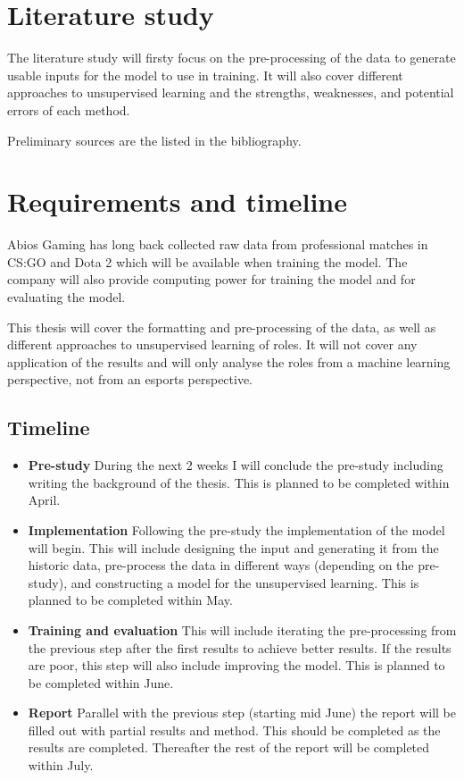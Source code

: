 \documentclass{article}
\begin{document}
\section{Literature study}
The literature study will firsty focus on the pre-processing of the data to generate usable inputs for the model to use in training. It will also cover different approaches to unsupervised learning and the strengths, weaknesses, and potential errors of each method.

Preliminary sources are the listed in the bibliography. \cite{coates2011analysis} \cite{figueiredo2002unsupervised} \cite{hastie2009unsupervised} \cite{10.1007/978-3-319-24589-8_9}

\section{Requirements and timeline}
Abios Gaming has long back collected raw data from professional matches in CS:GO and Dota 2 which will be available when training the model. The company will also provide computing power for training the model and for evaluating the model.

This thesis will cover the formatting and pre-processing of the data, as well as different approaches to unsupervised learning of roles. It will not cover any application of the results and will only analyse the roles from a machine learning perspective, not from an esports perspective.

\subsection{Timeline}
\begin{itemize}
\item{\bf Pre-study} During the next 2 weeks I will conclude the pre-study including writing the background of the thesis. This is planned to be completed within April.
\item{\bf Implementation} Following the pre-study the implementation of the model will begin. This will include designing the input and generating it from the historic data, pre-process the data in different ways (depending on the pre-study), and constructing a model for the unsupervised learning. This is planned to be completed within May.
\item{\bf Training and evaluation} This will include iterating the pre-processing from the previous step after the first results to achieve better results. If the results are poor, this step will also include improving the model. This is planned to be completed within June.
\item{\bf Report} Parallel with the previous step (starting mid June) the report will be filled out with partial results and method. This should be completed as the results are completed. Thereafter the rest of the report will be completed within July.
\end{itemize}

{}

\end{document}
